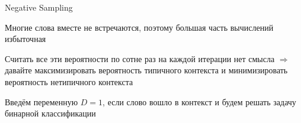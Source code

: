 \documentclass[notes,12pt, aspectratio=169]{beamer}
\newenvironment{wideitemize}{\itemize\addtolength{\itemsep}{10pt}}{\enditemize}
\begin{document}
\begin{frame}{Negative Sampling}
\begin{wideitemize} 
	\item  Многие слова вместе не встречаются, поэтому большая часть вычислений избыточная 
	
	\item Считать все эти вероятности по сотне раз на каждой итерации нет смысла $\Rightarrow$ давайте максимизировать вероятность типичного контекста и минимизировать вероятность нетипичного контекста 
	
	\item Введём переменную $D = 1$, если слово вошло в контекст и будем решать задачу бинарной классификации
\end{wideitemize} 
\end{frame} 
\end{document}
